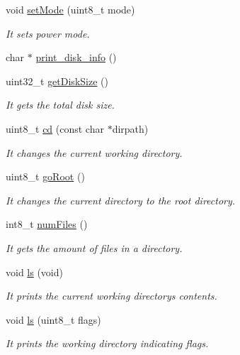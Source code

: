 \begin{DoxyCompactItemize}
\item 
void \hyperlink{class_wasp_s_d_a110582100a2d3aaedae1e2143b539d38}{set\+Mode} (uint8\+\_\+t mode)
\begin{DoxyCompactList}\small\item\em It sets power mode. \end{DoxyCompactList}\item 
char $\ast$ \hyperlink{class_wasp_s_d_a2c6f8aa990e2af347a6a3e66f664c2ed}{print\+\_\+disk\+\_\+info} ()
\item 
uint32\+\_\+t \hyperlink{class_wasp_s_d_aee074195db1e2bc5cc0afefe53c5f7d7}{get\+Disk\+Size} ()
\begin{DoxyCompactList}\small\item\em It gets the total disk size. \end{DoxyCompactList}\item 
uint8\+\_\+t \hyperlink{class_wasp_s_d_a90be16361e951e7cc5f9d6560e367530}{cd} (const char $\ast$dirpath)
\begin{DoxyCompactList}\small\item\em It changes the current working directory. \end{DoxyCompactList}\item 
uint8\+\_\+t \hyperlink{class_wasp_s_d_adcf1a17df2a7aeb3294d1efa29163780}{go\+Root} ()
\begin{DoxyCompactList}\small\item\em It changes the current directory to the root directory. \end{DoxyCompactList}\item 
int8\+\_\+t \hyperlink{class_wasp_s_d_ae3a14ea6abf645007ca99faf878397d3}{num\+Files} ()
\begin{DoxyCompactList}\small\item\em It gets the amount of files in a directory. \end{DoxyCompactList}\item 
void \hyperlink{class_wasp_s_d_a06bcee4baa08fa67b66eb17faaa8ab93}{ls} (void)
\begin{DoxyCompactList}\small\item\em It prints the current working directory\textquotesingle{}s contents. \end{DoxyCompactList}\item 
void \hyperlink{class_wasp_s_d_a782056bf89c3c1463d9071f415431c6f}{ls} (uint8\+\_\+t flags)
\begin{DoxyCompactList}\small\item\em It prints the working directory indicating flags. \end{DoxyCompactList}\item 

\end{DoxyCompactItemize}

